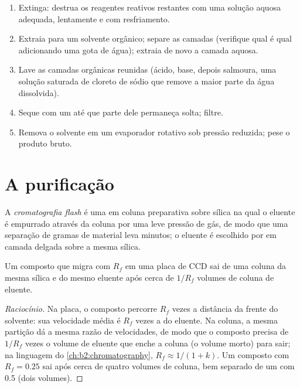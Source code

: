 \begin{method}\label{met:b2:lab-techniques-2:work-up}
\begin{enumerate}
  \item Extinga: destrua os reagentes reativos restantes com uma solução aquosa adequada, lentamente e
        com resfriamento.
  \item Extraia para um solvente orgânico; separe as camadas (verifique qual é qual adicionando uma gota
        de água); extraia de novo a camada aquosa.
  \item Lave as camadas orgânicas reunidas (ácido, base, depois salmoura, uma solução saturada de cloreto
        de sódio que remove a maior parte da água dissolvida).
  \item Seque com um  até que parte dele permaneça solta; filtre.
  \item Remova o solvente em um evaporador rotativo sob pressão reduzida; pese o produto bruto.
\end{enumerate}
\end{method}

\section{A purificação}

\begin{definition}\label{def:b2:lab-techniques-2:flash}
A \emph{cromatografia flash} é uma  em coluna preparativa sobre sílica na
qual o eluente é empurrado através da coluna por uma leve pressão de gás, de modo que uma separação de
gramas de material leva minutos; o eluente é escolhido por  em camada delgada sobre a mesma
sílica.
\end{definition}

\begin{proposition}\label{prop:b2:lab-techniques-2:column-volumes}
Um composto que migra com $R_f$ em uma placa de CCD sai de uma coluna da mesma sílica e do mesmo eluente
após cerca de $1/R_f$ volumes de coluna de eluente.
\end{proposition}

\begin{proof}[Raciocínio]
Na placa, o composto percorre $R_f$ vezes a distância da frente do solvente: sua velocidade média é $R_f$
vezes a do eluente. Na coluna, a mesma partição dá a mesma razão de velocidades, de modo que o composto
precisa de $1/R_f$ vezes o volume de eluente que enche a coluna (o volume morto) para sair; na
linguagem do \cref{ch:b2:chromatography}, $R_f \approx 1/(1 + k)$. Um composto com $R_f = 0.25$
sai após cerca de quatro volumes de coluna, bem separado de um com 0.5 (dois volumes).
\end{proof}

